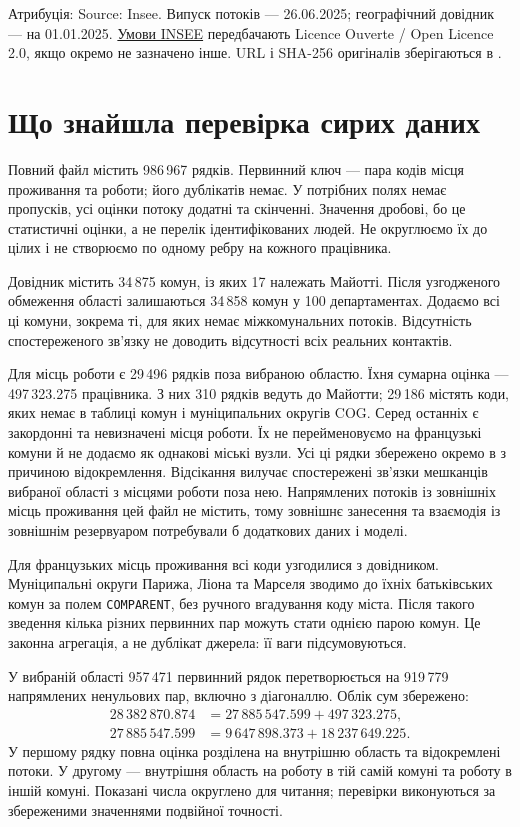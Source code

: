 \documentclass[11pt,a4paper]{article}
\begin{document}
Атрибуція: Source: Insee. Випуск потоків --- 26.06.2025; географічний довідник --- на 01.01.2025. \href{https://www.insee.fr/fr/information/2008466}{Умови INSEE} передбачають Licence Ouverte / Open Licence 2.0, якщо окремо не зазначено інше. URL і SHA-256 оригіналів зберігаються в .

\section{Що знайшла перевірка сирих даних}
Повний файл містить 986\,967 рядків. Первинний ключ --- пара кодів місця проживання та роботи; його дублікатів немає. У потрібних полях немає пропусків, усі оцінки потоку додатні та скінченні. Значення дробові, бо це статистичні оцінки, а не перелік ідентифікованих людей. Не округлюємо їх до цілих і не створюємо по одному ребру на кожного працівника.

Довідник містить 34\,875 комун, із яких 17 належать Майотті. Після узгодженого обмеження області залишаються 34\,858 комун у 100 департаментах. Додаємо всі ці комуни, зокрема ті, для яких немає міжкомунальних потоків. Відсутність спостереженого зв'язку не доводить відсутності всіх реальних контактів.

Для місць роботи є 29\,496 рядків поза вибраною областю. Їхня сумарна оцінка --- 497\,323.275 працівника. З них 310 рядків ведуть до Майотти; 29\,186 містять коди, яких немає в таблиці комун і муніципальних округів COG. Серед останніх є закордонні та невизначені місця роботи. Їх не перейменовуємо на французькі комуни й не додаємо як однакові міські вузли. Усі ці рядки збережено окремо в  з причиною відокремлення. Відсікання вилучає спостережені зв'язки мешканців вибраної області з місцями роботи поза нею. Напрямлених потоків із зовнішніх місць проживання цей файл не містить, тому зовнішнє занесення та взаємодія із зовнішнім резервуаром потребували б додаткових даних і моделі.

Для французьких місць проживання всі коди узгодилися з довідником. Муніципальні округи Парижа, Ліона та Марселя зводимо до їхніх батьківських комун за полем \texttt{COMPARENT}, без ручного вгадування коду міста. Після такого зведення кілька різних первинних пар можуть стати однією парою комун. Це законна агрегація, а не дублікат джерела: її ваги підсумовуються.

У вибраній області 957\,471 первинний рядок перетворюється на 919\,779 напрямлених ненульових пар, включно з діагоналлю. Облік сум збережено:
\begin{align*}
28\,382\,870.874 &= 27\,885\,547.599 + 497\,323.275,\\
27\,885\,547.599 &= 9\,647\,898.373 + 18\,237\,649.225.
\end{align*}
У першому рядку повна оцінка розділена на внутрішню область та відокремлені потоки. У другому --- внутрішня область на роботу в тій самій комуні та роботу в іншій комуні. Показані числа округлено для читання; перевірки виконуються за збереженими значеннями подвійної точності.
\end{document}
